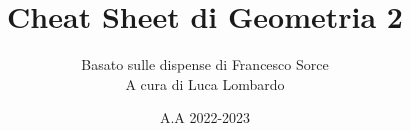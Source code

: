\documentclass[10pt]{report}
\title{\Huge{Cheat Sheet di Geometria 2}}
\date{A.A 2022-2023}
\author{Basato sulle dispense di Francesco Sorce\\A cura di Luca Lombardo}
\begin{document}
\maketitle

\begin{multicols*}{2}
    \tableofcontents
\end{multicols*}

\newpage




\end{document}
